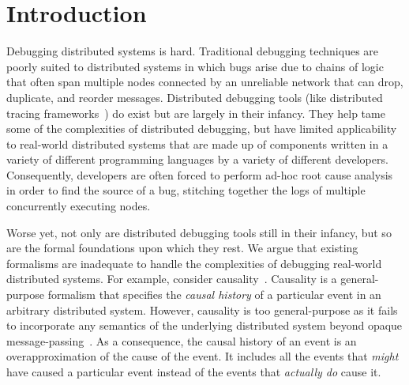 \section{Introduction}
Debugging distributed systems is hard. Traditional debugging techniques are
poorly suited to distributed systems in which bugs arise due to chains of logic
that often span multiple  nodes connected by an unreliable network that can
drop, duplicate, and reorder messages. Distributed debugging tools (like
distributed tracing frameworks~\cite{sigelman2010dapper, fonseca2007x}) do
exist but are largely in their infancy. They help tame some of the complexities
of distributed debugging, but have limited applicability to real-world
distributed systems that are made up of components written in a variety of
different programming languages by a variety of different developers. 
Consequently, developers are often forced to perform ad-hoc root cause analysis
in order to find the source of a bug, stitching together the logs of multiple
concurrently executing nodes. 

Worse yet, not only are distributed debugging tools still in their infancy, but
so are the formal foundations upon which they rest. 
 We argue that existing
formalisms are inadequate to handle the complexities of debugging real-world
distributed systems. For example, consider causality~\cite{lamport1978time}.
Causality is a general-purpose formalism that specifies the \emph{causal
history} of a particular event in an arbitrary distributed system. However,
causality is too general-purpose as it fails to incorporate any semantics of the
underlying distributed system beyond opaque message-passing~\cite{bailis2012potential}. As a consequence, the causal history of an event
is an overapproximation of the cause of the event. It includes all the events
that \emph{might} have caused a particular event instead of the events that
\emph{actually do} cause it.

